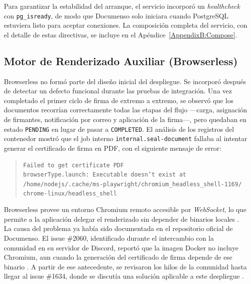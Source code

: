 Para garantizar la estabilidad del arranque, el servicio incorporó un \textit{healthcheck} con \texttt{pg\_isready}, de modo que Documenso solo iniciara cuando PostgreSQL estuviera listo para aceptar conexiones. La composición completa del servicio, con el detalle de estas directivas, se incluye en el Apéndice~\ref{AppendixB:Compose}.

\subsection{Motor de Renderizado Auxiliar (Browserless)}
\label{subsec:browserless}

Browserless no formó parte del diseño inicial del despliegue. Se incorporó después de detectar un defecto funcional durante las pruebas de integración. Una vez completado el primer ciclo de firma de extremo a extremo, se observó que los documentos recorrían correctamente todas las etapas del flujo ---carga, asignación de firmantes, notificación por correo y aplicación de la firma---, pero quedaban en estado \texttt{PENDING} en lugar de pasar a \texttt{COMPLETED}. El análisis de los registros del contenedor mostró que el job interno \texttt{internal.seal-document} fallaba al intentar generar el certificado de firma en PDF, con el siguiente mensaje de error:

\begin{quote}
\texttt{Failed to get certificate PDF} \\
\texttt{browserType.launch: Executable doesn't exist at} \\
\texttt{/home/nodejs/.cache/ms-playwright/chromium\_headless\_shell-1169/} \\
\texttt{chrome-linux/headless\_shell}
\end{quote}

Browserless provee un entorno Chromium remoto accesible por \textit{WebSocket}, lo que permite a la aplicación delegar el renderizado sin depender de binarios locales \cite{browserless_baas_start}. La causa del problema ya había sido documentada en el repositorio oficial de Documenso. El issue \#2060, identificado durante el intercambio con la comunidad en su servidor de Discord, reportó que la imagen Docker no incluye Chromium, aun cuando la generación del certificado de firma depende de ese binario \cite{documenso_issue_2060}. A partir de ese antecedente, se revisaron los hilos de la comunidad hasta llegar al issue \#1634, donde se discutía una solución aplicable a este despliegue \cite{documenso_issue_1634}.

